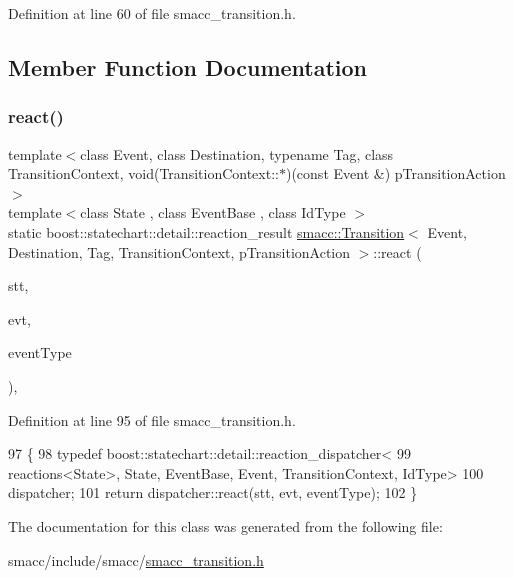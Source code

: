 Definition at line 60 of file smacc\+\_\+transition.\+h.



\subsection{Member Function Documentation}
\mbox{\label{classsmacc_1_1Transition_a8399e8d49fa6f3ac72b06df0b2010932}} 
\subsubsection{\texorpdfstring{react()}{react()}}
{\footnotesize\ttfamily template$<$class Event, class Destination, typename Tag, class Transition\+Context, void(\+Transition\+Context\+::$\ast$)(const Event \&) p\+Transition\+Action$>$ \\
template$<$class State , class Event\+Base , class Id\+Type $>$ \\
static boost\+::statechart\+::detail\+::reaction\+\_\+result \hyperlink{classsmacc_1_1Transition}{smacc\+::\+Transition}$<$ Event, Destination, Tag, Transition\+Context, p\+Transition\+Action $>$\+::react (\begin{DoxyParamCaption}\item[{State \&}]{stt,  }\item[{const Event\+Base \&}]{evt,  }\item[{const Id\+Type \&}]{event\+Type }\end{DoxyParamCaption})\hspace{0.3cm}{\ttfamily [inline]}, {\ttfamily [static]}}



Definition at line 95 of file smacc\+\_\+transition.\+h.


\begin{DoxyCode}
97   \{
98     \textcolor{keyword}{typedef} boost::statechart::detail::reaction\_dispatcher<
99         reactions<State>, State, EventBase, Event, TransitionContext, IdType>
100         dispatcher;
101     \textcolor{keywordflow}{return} dispatcher::react(stt, evt, eventType);
102   \}
\end{DoxyCode}


The documentation for this class was generated from the following file\+:\begin{DoxyCompactItemize}
\item 
smacc/include/smacc/\hyperlink{smacc__transition_8h}{smacc\+\_\+transition.\+h}\end{DoxyCompactItemize}
